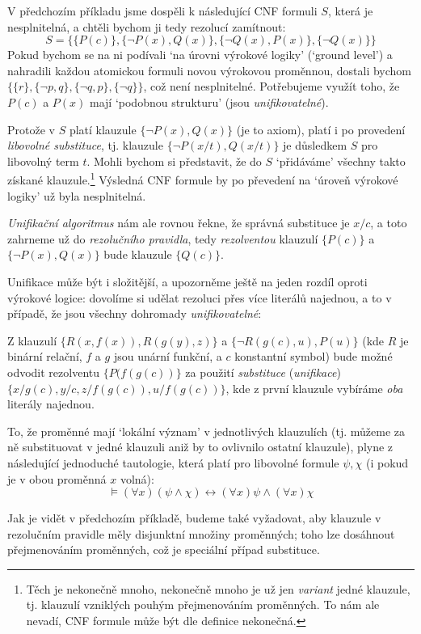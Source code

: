\begin{example}
    V předchozím příkladu jsme dospěli k následující CNF formuli $S$, která je nesplnitelná, a chtěli bychom ji tedy rezolucí zamítnout:    
    $$
    S = \{\{P(c)\},\{\neg P(x),Q(x)\},\{\neg Q(x),P(x)\},\{\neg Q(x)\}\}
    $$
    Pokud bychom se na ni podívali `na úrovni výrokové logiky' (`ground level') a nahradili každou atomickou formuli novou výrokovou proměnnou, dostali bychom $\{\{r\},\{\neg p,q\},\{\neg q,p\},\{\neg q\}\}$, což není nesplnitelné. Potřebujeme využít toho, že $P(c)$ a $P(x)$ mají `podobnou strukturu' (jsou \emph{unifikovatelné}).

    Protože v $S$ platí klauzule $\{\neg P(x),Q(x)\}$ (je to axiom), platí i po provedení \emph{libovolné substituce}, tj. klauzule $\{\neg P(x/t),Q(x/t)\}$ je důsledkem $S$ pro libovolný term $t$. Mohli bychom si představit, že do  $S$ `přidáváme' všechny takto získané klauzule.\footnote{Těch je nekonečně mnoho, nekonečně mnoho je už jen \emph{variant} jedné klauzule, tj. klauzulí vzniklých pouhým přejmenováním proměnných. To nám ale nevadí, CNF formule může být dle definice nekonečná.} Výsledná CNF formule by po převedení na `úroveň výrokové logiky' už byla nesplnitelná. 
    
    \emph{Unifikační algoritmus} nám ale rovnou řekne, že správná substituce je $x/c$, a toto zahrneme už do \emph{rezolučního pravidla}, tedy \emph{rezolventou} klauzulí $\{P(c)\}$ a $\{\neg P(x),Q(x)\}$ bude klauzule $\{Q(c)\}$.
\end{example}

Unifikace může být i složitější, a upozorněme ještě na jeden rozdíl oproti výrokové logice: dovolíme si udělat rezoluci přes více literálů najednou, a to v případě, že jsou všechny dohromady \emph{unifikovatelné}:

\begin{example}
    Z klauzulí $\{R(x,f(x)),R(g(y),z)\}$ a $\{\neg R(g(c),u),P(u)\}$ (kde $R$ je binární relační, $f$ a $g$ jsou unární funkční, a $c$ konstantní symbol) bude možné odvodit rezolventu $\{P(f(g(c))\}$ za použití \emph{substituce} (\emph{unifikace}) $\{x/g(c),y/c,z/f(g(c)),u/f(g(c))\}$, kde z první klauzule vybíráme \emph{oba} literály najednou.
\end{example}

\begin{remark}
    To, že proměnné mají `lokální význam' v jednotlivých klauzulích (tj. můžeme za ně substituovat v jedné klauzuli aniž by to ovlivnilo ostatní klauzule), plyne z následující jednoduché tautologie, která platí pro libovolné formule $\psi,\chi$ (i pokud je v obou proměnná $x$ volná):
    $$
    \models(\forall x)(\psi \land \chi) \leftrightarrow (\forall x)\psi \land (\forall x)\chi
    $$
    
    Jak je vidět v předchozím příkladě, budeme také vyžadovat, aby klauzule v rezolučním pravidle měly disjunktní množiny proměnných; toho lze dosáhnout přejmenováním proměnných, což je speciální případ substituce.  
\end{remark}


